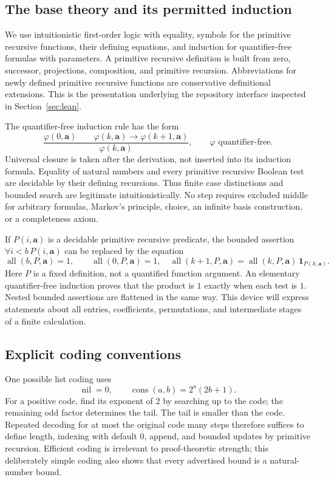 \subsection{The base theory and its permitted induction}

We use intuitionistic first-order logic with equality, symbols for the
primitive recursive functions, their defining equations, and induction
for quantifier-free formulas with parameters. A primitive recursive
definition is built from zero, successor, projections, composition, and
primitive recursion. Abbreviations for newly defined primitive recursive
functions are conservative definitional extensions. This is the
presentation underlying the repository interface inspected in
Section~\ref{sec:lean}.

The quantifier-free induction rule has the form
\[
 \frac{\varphi(0,\mathbf a)\qquad
       \varphi(k,\mathbf a)\longrightarrow\varphi(k+1,\mathbf a)}
      {\varphi(k,\mathbf a)},
 \qquad \varphi\text{ quantifier-free}.
\]
Universal closure is taken after the derivation, not inserted into its
induction formula. Equality of natural numbers and every primitive
recursive Boolean test are decidable by their defining recursions. Thus
finite case distinctions and bounded search are legitimate intuitionistically.
No step requires excluded middle for arbitrary formulas, Markov's
principle, choice, an infinite basis construction, or a completeness axiom.

If $P(i,\mathbf a)$ is a decidable primitive recursive predicate, the bounded
assertion $\forall i<b\,P(i,\mathbf a)$ can be replaced by the equation
\[
 \operatorname{all}(b,P,\mathbf a)=1,\qquad
 \operatorname{all}(0,P,\mathbf a)=1,\quad
 \operatorname{all}(k+1,P,\mathbf a)
 =\operatorname{all}(k,P,\mathbf a)\,\mathbf1_{P(k,\mathbf a)}.
\]
Here $P$ is a fixed definition, not a quantified function argument.
An elementary quantifier-free induction proves that the product is $1$
exactly when each test is $1$. Nested bounded assertions are flattened in
the same way. This device will express statements about all entries,
coefficients, permutations, and intermediate stages of a finite calculation.

\subsection{Explicit coding conventions}

One possible list coding uses
\[
 \operatorname{nil}=0,\qquad
 \operatorname{cons}(a,b)=2^a(2b+1).
\]
For a positive code, find its exponent of $2$ by searching up to the code;
the remaining odd factor determines the tail. The tail is smaller than
the code. Repeated decoding for at most the original code many steps
therefore suffices to define length, indexing with default $0$, append,
and bounded updates by primitive recursion. Efficient coding is
irrelevant to proof-theoretic strength; this deliberately simple coding
also shows that every advertised bound is a natural-number bound.

